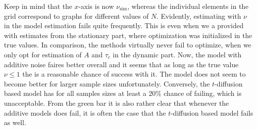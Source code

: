 Keep in mind that the $x$-axis is now $\nu_{\mathrm{sim}}$, whereas the individual elements in the grid correspond to graphs for different values of $N$. Evidently, estimating with $\nu$ in the model estimation fails quite frequently. This is even when we a provided with estimates from the stationary part, where optimization was initialized in the true values. In comparison, the methods virtually never fail to optimize, when we only opt for estimation of $A$ and $\tau_c$ in the dynamic part. Now, the model with additive noise faires better overall and it seems that as long as the true value $\nu\leq 1$ the is a reasonable chance of success with it. The model does not seem to become better for larger sample sizes unfortunately. Conversely, the $t$-diffusion based model has for all samples sizes at least a $20\%$ chance of failing, which is unacceptable. From the green bar it is also rather clear that whenever the additive models does fail, it is often the case that the $t$-diffusion based model fails as well.  
